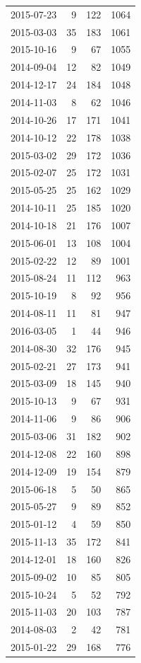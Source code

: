\begin{tabular}{lrrr}
2015-07-23 & 9 & 122 & 1064 \\
2015-03-03 & 35 & 183 & 1061 \\
2015-10-16 & 9 & 67 & 1055 \\
2014-09-04 & 12 & 82 & 1049 \\
2014-12-17 & 24 & 184 & 1048 \\
2014-11-03 & 8 & 62 & 1046 \\
2014-10-26 & 17 & 171 & 1041 \\
2014-10-12 & 22 & 178 & 1038 \\
2015-03-02 & 29 & 172 & 1036 \\
2015-02-07 & 25 & 172 & 1031 \\
2015-05-25 & 25 & 162 & 1029 \\
2014-10-11 & 25 & 185 & 1020 \\
2014-10-18 & 21 & 176 & 1007 \\
2015-06-01 & 13 & 108 & 1004 \\
2015-02-22 & 12 & 89 & 1001 \\
2015-08-24 & 11 & 112 & 963 \\
2015-10-19 & 8 & 92 & 956 \\
2014-08-11 & 11 & 81 & 947 \\
2016-03-05 & 1 & 44 & 946 \\
2014-08-30 & 32 & 176 & 945 \\
2015-02-21 & 27 & 173 & 941 \\
2015-03-09 & 18 & 145 & 940 \\
2015-10-13 & 9 & 67 & 931 \\
2014-11-06 & 9 & 86 & 906 \\
2015-03-06 & 31 & 182 & 902 \\
2014-12-08 & 22 & 160 & 898 \\
2014-12-09 & 19 & 154 & 879 \\
2015-06-18 & 5 & 50 & 865 \\
2015-05-27 & 9 & 89 & 852 \\
2015-01-12 & 4 & 59 & 850 \\
2015-11-13 & 35 & 172 & 841 \\
2014-12-01 & 18 & 160 & 826 \\
2015-09-02 & 10 & 85 & 805 \\
2015-10-24 & 5 & 52 & 792 \\
2015-11-03 & 20 & 103 & 787 \\
2014-08-03 & 2 & 42 & 781 \\
2015-01-22 & 29 & 168 & 776 \\

\end{tabular}
